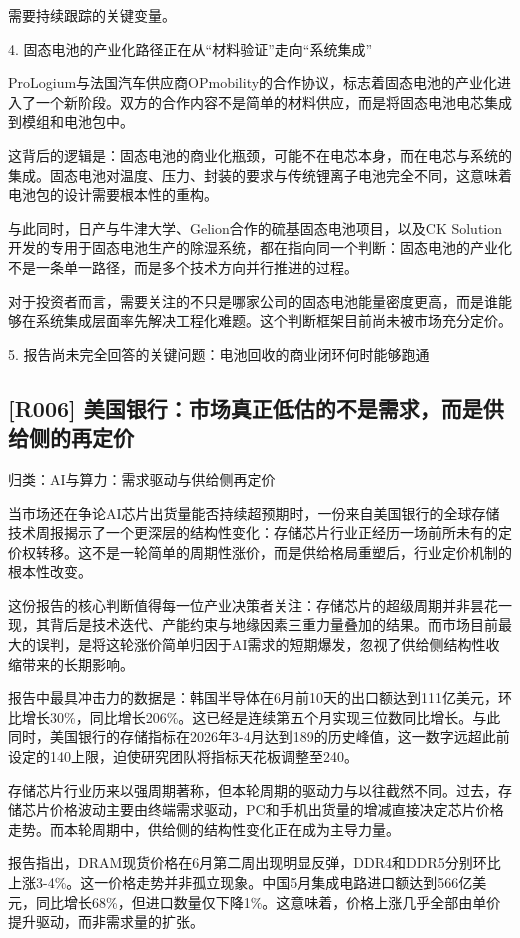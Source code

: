 \documentclass[11pt]{ctexart}
\begin{document}
需要持续跟踪的关键变量。

4. 固态电池的产业化路径正在从“材料验证”走向“系统集成”

ProLogium与法国汽车供应商OPmobility的合作协议，标志着固态电池的产业化进入了一个新阶段。双方的合作内容不是简单的材料供应，而是将固态电池电芯集成到模组和电池包中。

这背后的逻辑是：固态电池的商业化瓶颈，可能不在电芯本身，而在电芯与系统的集成。固态电池对温度、压力、封装的要求与传统锂离子电池完全不同，这意味着电池包的设计需要根本性的重构。

与此同时，日产与牛津大学、Gelion合作的硫基固态电池项目，以及CK Solution开发的专用于固态电池生产的除湿系统，都在指向同一个判断：固态电池的产业化不是一条单一路径，而是多个技术方向并行推进的过程。

对于投资者而言，需要关注的不只是哪家公司的固态电池能量密度更高，而是谁能够在系统集成层面率先解决工程化难题。这个判断框架目前尚未被市场充分定价。

5. 报告尚未完全回答的关键问题：电池回收的商业闭环何时能够跑通

\subsection{[R006] 美国银行：市场真正低估的不是需求，而是供给侧的再定价}
{\small\color{refgray}归类：AI与算力：需求驱动与供给侧再定价}

当市场还在争论AI芯片出货量能否持续超预期时，一份来自美国银行的全球存储技术周报揭示了一个更深层的结构性变化：存储芯片行业正经历一场前所未有的定价权转移。这不是一轮简单的周期性涨价，而是供给格局重塑后，行业定价机制的根本性改变。

这份报告的核心判断值得每一位产业决策者关注：存储芯片的超级周期并非昙花一现，其背后是技术迭代、产能约束与地缘因素三重力量叠加的结果。而市场目前最大的误判，是将这轮涨价简单归因于AI需求的短期爆发，忽视了供给侧结构性收缩带来的长期影响。

报告中最具冲击力的数据是：韩国半导体在6月前10天的出口额达到111亿美元，环比增长30\%，同比增长206\%。这已经是连续第五个月实现三位数同比增长。与此同时，美国银行的存储指标在2026年3-4月达到189的历史峰值，这一数字远超此前设定的140上限，迫使研究团队将指标天花板调整至240。

存储芯片行业历来以强周期著称，但本轮周期的驱动力与以往截然不同。过去，存储芯片价格波动主要由终端需求驱动，PC和手机出货量的增减直接决定芯片价格走势。而本轮周期中，供给侧的结构性变化正在成为主导力量。

报告指出，DRAM现货价格在6月第二周出现明显反弹，DDR4和DDR5分别环比上涨3-4\%。这一价格走势并非孤立现象。中国5月集成电路进口额达到566亿美元，同比增长68\%，但进口数量仅下降1\%。这意味着，价格上涨几乎全部由单价提升驱动，而非需求量的扩张。
\end{document}

